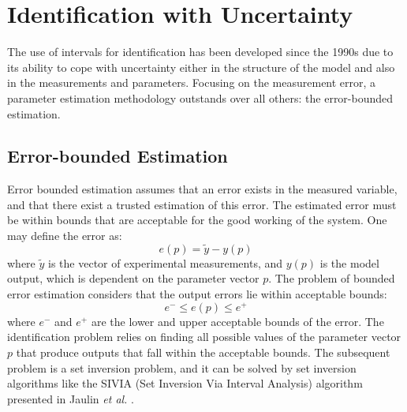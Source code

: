 \section{Identification with Uncertainty}
\label{sec:IntervalIdentification}

The use of intervals for identification has been developed since the 1990s due to its ability to cope with uncertainty either in the structure of the model and also in the measurements and parameters. Focusing on the measurement error, a parameter estimation methodology outstands over all others: the error-bounded estimation.


\subsection{Error-bounded Estimation}
\label{sec:ErrorBoundedEstimation}

Error bounded estimation assumes that an error exists in the measured variable, and that there exist a trusted estimation of this error. The estimated error must be within bounds that are acceptable for the good working of the system. One may define the error as:
\begin{equation}
	e(p)=\tilde{y}-y(p)
\label{eq:output_error}
\end{equation}
where $\tilde{y}$ is the vector of experimental measurements, and $y(p)$ is the model output, which is dependent on the parameter vector $p$. The problem of bounded error estimation considers that the output errors lie within acceptable bounds:
\begin{equation}
	e^{-} \leq e(p) \leq e^{+}
\label{eq:error_bound}
\end{equation}
where $e^{-}$ and $e^{+}$ are the lower and upper acceptable bounds of the error. The identification problem relies on finding all possible values of the parameter vector $p$ that produce outputs that fall within the acceptable bounds. The subsequent problem is a set inversion problem, and it can be solved by set inversion algorithms like the SIVIA (Set Inversion Via Interval Analysis) algorithm presented in Jaulin \textit{et al.} \cite{jaulin2001applied}.


